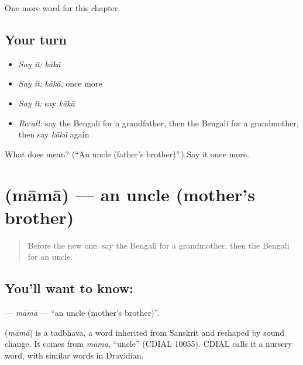 \begin{grammarlens}[title={What you've built}]
One more word for this chapter.
\end{grammarlens}

\subsection*{Your turn}
\begin{itemize}
\raggedright
  \item \emph{Say it:} \emph{kākā}
  \item \emph{Say it:} \emph{kākā}, once more
  \item \emph{Say it:} say \emph{kākā}
  \item \emph{Recall:} say the Bengali for a grandfather, then the Bengali for a grandmother, then say \emph{kākā} again
\end{itemize}

\begin{tcolorbox}[breakable,colback=teal!4,colframe=teal!35!black,title={Before you move on}]
What does  mean? (\textquotedblleft{}An uncle (father's brother)\textquotedblright{}.) Say it once more.
\end{tcolorbox}
\section[\texorpdfstring{\bn{মামা} (māmā)}{মামা (māmā)}]{ (māmā) — an uncle (mother's brother)}

\label{lesson:BN-C46-mama}



\begin{quote}
Before the new one: say the Bengali for a grandmother, then the Bengali for an uncle.
\end{quote}

\subsection*{You'll want to know: }
\textbf{} — \emph{māmā} — \textquotedblleft{}an uncle (mother's brother)\textquotedblright{}.

\begin{cousinweb}
\textbf{} (\emph{māmā}) is a tadbhava, a word inherited from Sanskrit and reshaped by sound change. It comes from \emph{māma}, \textquotedblleft{}uncle\textquotedblright{} (CDIAL 10055). CDIAL calls it a nursery word, with similar words in Dravidian.
\end{cousinweb}


